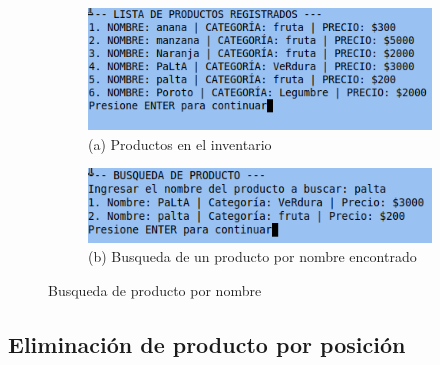 \documentclass[12pt]{article}
\begin{document}
\begin{figure}[H]
    \centering

    \begin{subfigure}[b]{0.6\textwidth}
        \centering
        \includegraphics[width=\textwidth]{Imagenes/img10.png}
        \caption*{(a) Productos en el inventario}
    \end{subfigure}
    \hfill
    \begin{subfigure}[b]{0.6\textwidth}
        \centering
        \includegraphics[width=\textwidth]{Imagenes/img11.png}
        \caption*{(b) Busqueda de un producto por nombre encontrado}
    \end{subfigure}

    \caption{Busqueda de producto por  nombre}
    \label{fig:busqueda de producto}
\end{figure}

\subsection{Eliminación de producto por posición}
\end{document}
